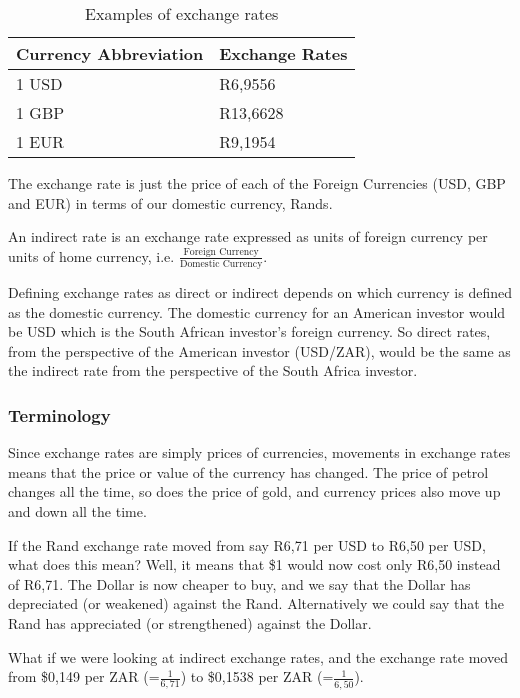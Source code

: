 \documentclass[10pt,a4paper,titlepage,twoside,openright]{report}
\begin{document}
\begin{table}[htbp]
\begin{center}
\caption{Examples of exchange rates}
\begin{tabular}{|l|l|}\hline\hline
\textbf{Currency Abbreviation}&\textbf{Exchange Rates}\\\hline\hline
1 USD &R6,9556\\\hline
1 GBP &R13,6628\\\hline
1 EUR &R9,1954\\\hline\hline
\end{tabular}
\end{center}
\end{table}

The exchange rate is just the price of each of the Foreign Currencies (USD, GBP and EUR) in terms of our domestic currency, Rands.

An indirect rate is an exchange rate expressed as units of foreign currency per units of home currency, i.e. $\frac{\mbox{Foreign Currency}}{\mbox{Domestic Currency}}$.

Defining exchange rates as direct or indirect depends on which currency is defined as the domestic currency. The domestic currency for an American investor would be USD which is the South African investor's foreign currency. So direct rates, from the perspective of the American investor (USD/ZAR), would be the same as the indirect rate from the perspective of the South Africa investor.

\subsubsection{Terminology}
Since exchange rates are simply prices of currencies, movements in exchange rates means that the price or value of the currency has changed. The price of petrol changes all the time, so does the price of gold, and currency prices also move up and down all the time.

If the Rand exchange rate moved from say R6,71 per USD to R6,50 per USD, what does this mean? Well, it means that \$1 would now cost only R6,50 instead of R6,71. The Dollar is now cheaper to buy, and we say that the Dollar has depreciated (or weakened) against the Rand. Alternatively we could say that the Rand has appreciated (or strengthened) against the Dollar.

What if we were looking at indirect exchange rates, and the exchange rate moved from \$0,149 per ZAR (=$\frac{1}{6,71}$) to \$0,1538 per ZAR (=$ \frac{1}{6,50}$).
\end{document}
